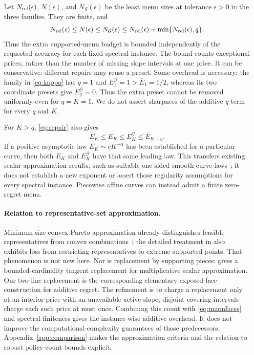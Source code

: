 Let $N_{\rm rel}(\epsilon)$, $N(\epsilon)$, and
$N_{\mathcal G}(\epsilon)$ be the least menu sizes at tolerance
$\epsilon>0$ in the three families. They are finite, and
\begin{equation}\label{eq:cardinalityrepair}
 N_{\rm rel}(\epsilon)\le N(\epsilon)\le N_{\mathcal G}(\epsilon)
 \le N_{\rm rel}(\epsilon)+\min\{N_{\rm rel}(\epsilon),q\}.
\end{equation}
Thus the extra supported-menu budget is bounded independently of the
requested accuracy for each fixed spectral instance. The bound counts
exceptional prices, rather than the number of missing slope intervals
at one price. It can be conservative: different repairs may reuse a
preset. Some overhead is necessary: the family in \eqref{eq:kappa}
has $q=1$ and $E_1^{\mathcal G}=1>\overline E_1=1/2$, whereas its
two coordinate presets give $E_2^{\mathcal G}=0$. Thus the extra preset
cannot be removed uniformly even for $q=K=1$. We do not assert sharpness
of the additive $q$ term for every $q$ and $K$.

For $K>q$, \eqref{eq:repair} also gives
\begin{equation}\label{eq:asymptoticsandwich}
 \overline E_K\le E_K\le E_K^{\mathcal G}\le\overline E_{K-q}.
\end{equation}
If a positive asymptotic law $\overline E_K\sim cK^{-\alpha}$ has been
established for a particular curve, then both $E_K$ and
$E_K^{\mathcal G}$ have that same leading law. This transfers existing
scalar approximation results, such as suitable one-sided smooth-curve
laws~\cite{gaubert2011}; it does not establish a new exponent or assert
those regularity assumptions for every spectral instance. Piecewise
affine curves can instead admit a finite zero-regret menu.

\paragraph{Relation to representative-set approximation.}
Minimum-size convex Pareto approximation already distinguishes feasible
representatives from convex combinations~\cite{diakonikolas2008}; the
detailed treatment in \cite[Sections~5.2--5.3]{diakonikolas2011} also
exhibits loss from restricting representatives to extreme supported points.
That phenomenon is not new here. Nor is replacement by supporting pieces:
\cite[Lemma~2]{magnanti2012} gives a bounded-cardinality tangent replacement
for multiplicative scalar approximation. Our two-line replacement is the
corresponding elementary exposed-face construction for additive regret.
The refinement is to charge a replacement only at an interior price with
an unavailable active slope; disjoint covering intervals charge each such
price at most once. Combining this count with \eqref{eq:unionfaces} and
spectral finiteness gives the instance-wise additive overhead. It does not
improve the computational-complexity guarantees of those predecessors.
Appendix~\ref{app:comparison} makes the approximation criteria and the
relation to robust policy-count bounds explicit.
